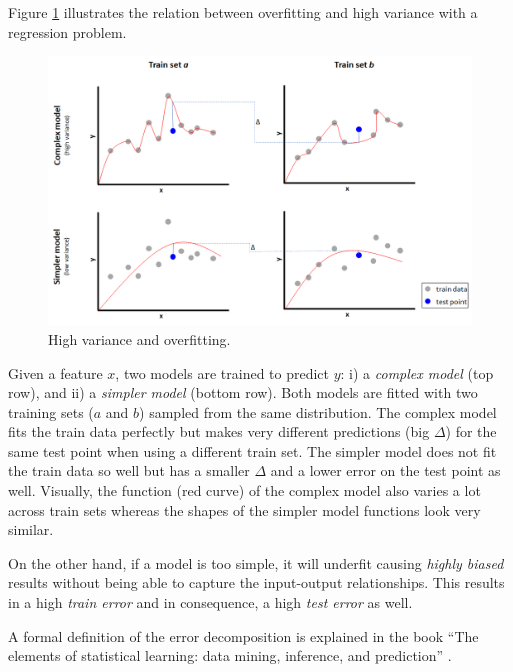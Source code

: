 \documentclass[
  11pt,
]{krantz}
\makeatletter
\newenvironment{kframe}{%
\medskip{}
\setlength{\fboxsep}{.8em}
 \def\at@end@of@kframe{}%
 \ifinner\ifhmode%
  \def\at@end@of@kframe{\end{minipage}}%
  \begin{minipage}{\columnwidth}%
 \fi\fi%
 \def\FrameCommand##1{\hskip\@totalleftmargin \hskip-\fboxsep
 \colorbox{shadecolor}{##1}\hskip-\fboxsep
     \hskip-\linewidth \hskip-\@totalleftmargin \hskip\columnwidth}%
 \MakeFramed {\advance\hsize-\width
   \@totalleftmargin\z@ \linewidth\hsize
   \@setminipage}}%
 {\par\unskip\endMakeFramed%
 \at@end@of@kframe}
\newenvironment{rmdblock}[1]
  {
  \begin{itemize}
  \renewcommand{\labelitemi}{
    \raisebox{-.7\height}[0pt][0pt]{
      {\setkeys{Gin}{width=3em,keepaspectratio}\texttt{[image: images/icons/\#1]}}
    }
  }
  \setlength{\fboxsep}{1em}
  \begin{kframe}
  \item
  }
  {
  \end{kframe}
  \end{itemize}
  }
\newenvironment{rmdinfo}
  {\begin{rmdblock}{info}}
  {\end{rmdblock}}
\makeatother
\begin{document}
Figure \ref{fig:overfittingVariance} illustrates the relation between overfitting and high variance with a regression problem.

\begin{figure}

{\centering \includegraphics[width=1\linewidth]{images/overfitting_variance} 

}

\caption{High variance and overfitting.}\label{fig:overfittingVariance}
\end{figure}

Given a feature \(x\), two models are trained to predict \(y\): i) a \emph{complex model} (top row), and ii) a \emph{simpler model} (bottom row). Both models are fitted with two training sets (\(a\) and \(b\)) sampled from the same distribution. The complex model fits the train data perfectly but makes very different predictions (big \(\Delta\)) for the same test point when using a different train set. The simpler model does not fit the train data so well but has a smaller \(\Delta\) and a lower error on the test point as well. Visually, the function (red curve) of the complex model also varies a lot across train sets whereas the shapes of the simpler model functions look very similar.

On the other hand, if a model is too simple, it will underfit causing \emph{highly biased} results without being able to capture the input-output relationships. This results in a high \emph{train error} and in consequence, a high \emph{test error} as well.

\begin{rmdinfo}
A formal definition of the error decomposition is explained in the book ``The elements of statistical learning: data mining, inference, and prediction'' \citep{hastie2009elements}.
\end{rmdinfo}
\end{document}
